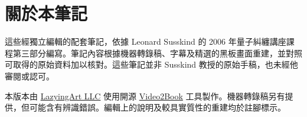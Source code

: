 \documentclass[11pt,oneside]{book}
\begin{document}
\frontmatter
\hypersetup{pageanchor=false}

\hypersetup{pageanchor=true}

\clearpage
\chapter*{關於本筆記}
這些經獨立編輯的配套筆記，依據 Leonard Susskind 的 2006 年量子糾纏講座課程第三部分編寫。筆記內容根據機器轉錄稿、字幕及精選的黑板畫面重建，並對照可取得的原始資料加以核對。這些筆記並非 Susskind 教授的原始手稿，也未經他審閱或認可。

本版本由 \href{https://lazying.art}{LazyingArt LLC} 使用開源 \href{https://github.com/lachlanchen/Video2Book}{Video2Book} 工具製作。機器轉錄稿另有提供，但可能含有辨識錯誤。編輯上的說明及較具實質性的重建均於註腳標示。
\clearpage
\tableofcontents
\mainmatter








\end{document}
